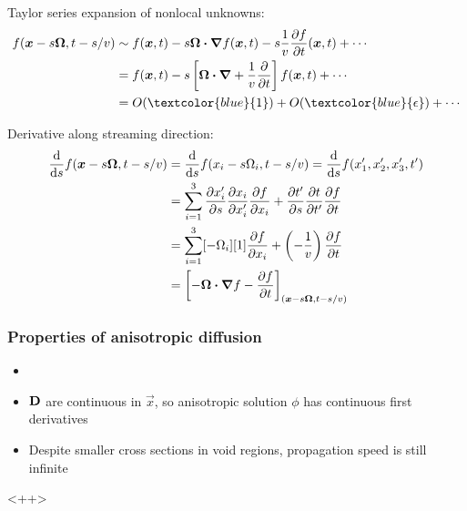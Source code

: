 \documentclass{beamer}
\newcommand{\Dtens}{\mat{D}}
\newcommand{\epsiloncolor}[1]{\textcolor{blue}{#1}}
\begin{document}
\begin{frame}
  Taylor series expansion of nonlocal unknowns:
  \begin{align*}
    f(\vec{x} - s \vec{\Omega}, t-s/v)
    &\sim
    f(\vec{x}, t) - s \vec{\Omega} \vd \del f(\vec{x}, t)
    - s\frac{1}{v} \pder{f}{t}(\vec{x}, t) + \cdots
    \\
    &= f(\vec{x}, t) - s \left[ \vec{\Omega} \vd \del
    + \frac{1}{v} \pder{}{t} \right] f(\vec{x}, t) + \cdots
    \\
    &= O(\epsiloncolor{1}) +
    O(\epsiloncolor{\epsilon}) + \cdots
  \end{align*}

  Derivative along streaming direction:
  \begin{align*}
    \frac{\mathrm{d} }{\mathrm{d} s} f(\bm{x} - s \bm{\Omega}, t-s/v)
    &=  \frac{\mathrm{d} }{\mathrm{d} s} f(x_i - s \Omega_i, t-s/v)
    = \frac{\mathrm{d} }{\mathrm{d} s} f(x_1',x_2',x_3',t')
    \\
    &= \sum_{i=1}^{3}
    \frac{\partial x_i'}{\partial s}\frac{\partial x_i}{\partial x_i'} \frac{\partial f}{\partial x_i}
    + \frac{\partial t'}{\partial s}\frac{\partial t}{\partial t'} \frac{\partial f}{\partial t}
    \\
    &= \sum_{i=1}^{3} [- \Omega_i][1]\frac{\partial f}{\partial x_i} 
    + \left( -\frac{1}{v} \right)  \frac{\partial f}{\partial t}
    \\
    &= \left[ -\bm{\Omega} \bm{\cdot} \bm{\nabla} f - \frac{\partial f}{\partial t} \right]_{(\bm{x} - s
    \bm{\Omega}, t-s/v)}
  \end{align*}
\end{frame}
\begin{frame}
  \frametitle{Properties of anisotropic diffusion}
  \begin{itemize}
    \item
    \item $\Dtens$ are continuous in $\vec{x}$, so anisotropic solution $\phi$
      has continuous first derivatives
    \item Despite smaller cross sections in void regions, propagation speed is
      still infinite
  \end{itemize}<++>
\end{frame}
\end{document}
